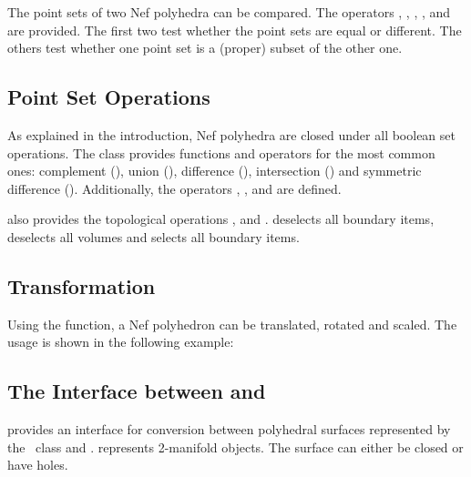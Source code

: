 The point sets of two Nef polyhedra can be compared. The operators \ccc{==}, 
\ccc{!=},
\ccc{<=}, \ccc{>=}, \ccc{<} and \ccc{>} 
are provided. The first two test whether the point sets 
are equal or different. The others test whether one point set is a (proper) 
subset of the other one.


\subsection{Point Set Operations}

As explained in the introduction, Nef polyhedra are closed under all boolean 
set operations. The class  provides functions and
operators for the most common ones: complement (), union (), 
difference (), intersection () and 
symmetric difference (). Additionally, the operators 
\ccc{*=}, \ccc{-=}, \ccc{*=} and \ccc{^=} are defined.

 also provides
the topological operations ,  and 
.  deselects all boundary items, 
 deselects all volumes and  selects all
boundary items. 


\subsection{Transformation}

Using the  function, a Nef polyhedron can be translated, 
rotated and scaled. The usage is shown in the following example:


\subsection{The Interface between  and }
\label{sectionNef_3Polyhedron}

 provides an interface for conversion 
between polyhedral surfaces
represented by the \cgal\ class  and . 
 represents 2-manifold objects. The surface can either be
closed or have holes.

